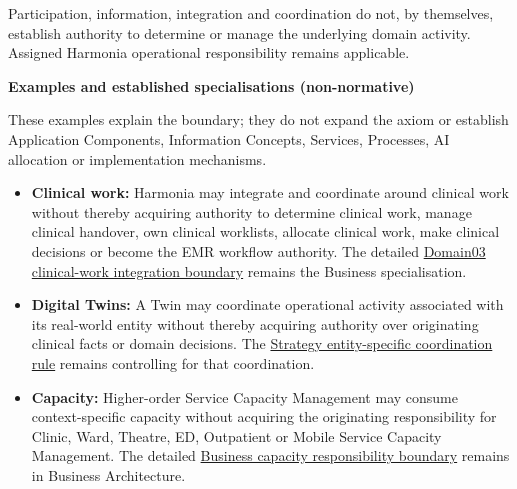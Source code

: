 Participation, information, integration and coordination do not, by
themselves, establish authority to determine or manage the underlying domain
activity. Assigned Harmonia operational responsibility remains applicable.



\par\medskip\textbf{Examples and established specialisations (non-normative)}\par


These examples explain the boundary; they do not expand the axiom or
establish Application Components, Information Concepts, Services, Processes,
AI allocation or implementation mechanisms.



\begin{itemize}


\item \textbf{Clinical work:} Harmonia may integrate and coordinate around clinical work
  without thereby acquiring authority to determine clinical work, manage
  clinical handover, own clinical worklists, allocate clinical work, make
  clinical decisions or become the EMR workflow authority. The detailed
  \href{\detokenize{../../../../../../../../docs/markdown/03-business-architecture/metamodel/business-architecture-metamodel.md#37-clinical-work-integration-boundary}}{Domain03 clinical-work integration boundary}
  remains the Business specialisation.

\item \textbf{Digital Twins:} A Twin may coordinate operational activity associated
  with its real-world entity without thereby acquiring authority over
  originating clinical facts or domain decisions. The
  \href{\detokenize{../../../../../../../../docs/markdown/02-strategy/strategic-views/logical-component-responsibilities.md#entity-specific-operational-coordination}}{Strategy entity-specific coordination rule}
  remains controlling for that coordination.

\item \textbf{Capacity:} Higher-order Service Capacity Management may consume
  context-specific capacity without acquiring the originating responsibility
  for Clinic, Ward, Theatre, ED, Outpatient or Mobile Service Capacity
  Management. The detailed
  \href{\detokenize{../../../../../../../../docs/markdown/03-business-architecture/behaviours/04-health-service-operations.md#capacity-management-responsibility-boundary}}{Business capacity responsibility boundary}
  remains in Business Architecture.


\end{itemize}
